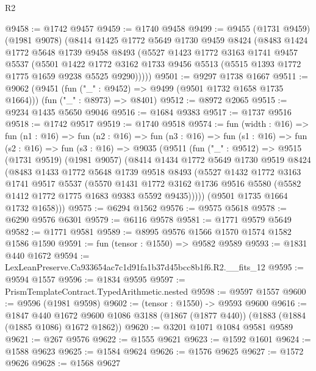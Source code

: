 \begin{lexlean}{R2}
\begin{coremodule}
@9458 := @1742 @9457
@9459 := @1740 @9458
@9499 := @9455
    (@1731 @9459)
    (@1981 @9078)
    (@8414
      @1425
      @1772
      @5649
      @1730
      @9459
      @8424
      (@8483
        @1424
        @1772
        @5648
        @1739
        @9458
        @8493
        (@5527
          @1423
          @1772
          @3163
          @1741
          @9457
          @5537
          (@5501
            @1422
            @1772
            @3162
            @1733
            @9456
            @5513
            (@5515 @1393 @1772 @1775 @1659 @9238 @5525 @9290)))))
@9501 := @9297 @1738 @1667
@9511 := @9062
    (@9451 (fun ("_" : @9452) => @9499 (@9501 @1732 @1658 @1735 @1664)))
    (fun ("_" : @8973) => @8401)
@9512 := @8972 @2065
@9515 := @9234 @1435 @5650 @9046
@9516 := @1684 @9383
@9517 := @1737 @9516
@9518 := @1742 @9517
@9519 := @1740 @9518
@9574 := fun (width : @16) =>
  fun (n1 : @16) =>
  fun (n2 : @16) =>
  fun (n3 : @16) =>
  fun (s1 : @16) =>
  fun (s2 : @16) =>
  fun (s3 : @16) =>
  @9035
    (@9511
      (fun ("_" : @9512) =>
      @9515
        (@1731 @9519)
        (@1981 @9057)
        (@8414
          @1434
          @1772
          @5649
          @1730
          @9519
          @8424
          (@8483
            @1433
            @1772
            @5648
            @1739
            @9518
            @8493
            (@5527
              @1432
              @1772
              @3163
              @1741
              @9517
              @5537
              (@5570
                @1431
                @1772
                @3162
                @1736
                @9516
                @5580
                (@5582 @1412 @1772 @1775 @1683 @9383 @5592 @9435)))))
        (@9501 @1735 @1664 @1732 @1658)))
@9575 := @6294 @1562
@9576 := @9575 @5618
@9578 := @6290 @9576 @6301
@9579 := @6116 @9578
@9581 := @1771 @9579 @5649
@9582 := @1771 @9581
@9589 := @8995 @9576 @1566 @1570 @1574 @1582 @1586 @1590
@9591 := fun (tensor : @1550) => @9582 @9589
@9593 := @1831 @440 @1672
@9594 := LexLeanPreserve.Ca933654ac7c1d91fa1b37d45bcc8b1f6.R2.__fits_12
@9595 := @9594 @1557
@9596 := @1834 @9595
@9597 := PrismTemplateContract.TypedArithmetic.nested
@9598 := @9597 @1557
@9600 := @9596 (@1981 @9598)
@9602 := (tensor : @1550) -> @9593 @9600
@9616 := @1847
    @440
    @1672
    @9600
    @1086
    @3188
    (@1867 (@1877 @440))
    (@1883 (@1884 (@1885 @1086) @1672 @1862))
@9620 := @3201 @1071 @1084 @9581 @9589
@9621 := @267 @9576
@9622 := @1555 @9621
@9623 := @1592 @1601
@9624 := @1588 @9623
@9625 := @1584 @9624
@9626 := @1576 @9625
@9627 := @1572 @9626
@9628 := @1568 @9627

\end{coremodule}
\end{lexlean}
